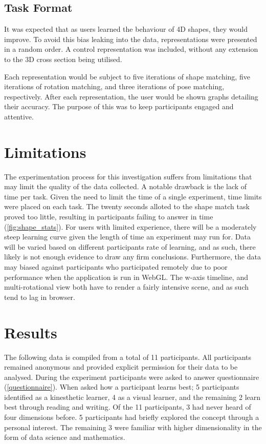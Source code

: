 \documentclass{l4proj}
\begin{document}
\subsection{Task Format}

It was expected that as users learned the behaviour of 4D shapes, they would improve. To avoid this bias leaking into the data, representations were presented in a random order. A control representation was included, without any extension to the 3D cross section being utilised.

Each representation would be subject to five iterations of shape matching, five iterations of rotation matching, and three iterations of pose matching, respectively.
After each representation, the user would be shown graphs detailing their accuracy. The purpose of this was to keep participants engaged and attentive.

\section{Limitations}
\label{limiations}

The experimentation process for this investigation suffers from limitations that may limit the quality of the data collected. 
A notable drawback is the lack of time per task. Given the need to limit the time of a single experiment, time limits were placed on each task. The twenty seconds alloted to the shape match task proved too little, resulting in participants failing to answer in time (\cref{fig:shape_stats}). 
For users with limited experience, there will be a moderately steep learning curve given the length of time an experiment may run for. Data will be varied based on different participants rate of learning, and as such, there likely is not enough evidence to draw any firm conclusions.
Furthermore, the data may biased against participants who participated remotely due to poor performance when the application is run in WebGL. The w-axis timeline, and multi-rotational view both have to render a fairly intensive scene, and as such tend to lag in browser.

\section{Results}

The following data is compiled from a total of 11 participants. All participants remained anonymous and provided explicit permission for their data to be analysed. During the experiment participants were asked to answer questionnaire (\ref{questionnaire}).
When asked how a participant learns best; 5 participants identified as a kinesthetic learner, 4 as a visual learner, and the remaining 2 learn best through reading and writing.
Of the 11 participants, 3 had never heard of four dimensions before. 5 participants had briefly explored the concept through a personal interest. The remaining 3 were familiar with higher dimensionality in the form of data science and mathematics.
\end{document}
